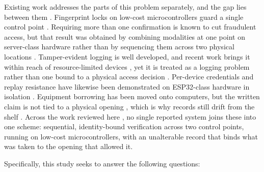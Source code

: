 Existing work addresses the parts of this problem separately, and the gap
lies between them \parencite{alsayaydeh2025, mohammed2025, koisser2023,
cepeda2025}. Fingerprint locks on low-cost microcontrollers guard a single
control point \parencite{alsayaydeh2025}. Requiring more than one confirmation
is known to cut fraudulent access, but that result was obtained by combining
modalities at one point on server-class hardware rather than by sequencing them
across two physical locations \parencite{mohammed2025}. Tamper-evident logging
is well developed, and recent work brings it within reach of resource-limited
devices \parencite{yagiz2026}, yet it is treated as a logging problem rather
than one bound to a physical access decision \parencite{koisser2023}. Per-device
credentials and replay resistance have likewise been demonstrated on ESP32-class
hardware in isolation \parencite{lkhluf2026}. Equipment borrowing has been moved
onto computers, but the written claim is not tied to a physical opening
\parencite{cepeda2025}, which is why records still drift from the shelf
\parencite{linuwih2025}. Across the work reviewed here
\parencite{alsayaydeh2025, mohammed2025, koisser2023, yagiz2026,
lkhluf2026, cepeda2025, linuwih2025}, no single reported system joins these
into one scheme: sequential, identity-bound verification across two control
points, running on low-cost microcontrollers, with an unalterable record
that binds what was taken to the opening that allowed it.

Specifically, this study seeks to answer the following questions:

